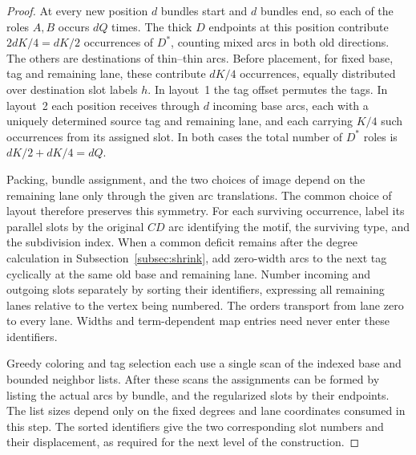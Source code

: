 \begin{proof}
\smallskip
At every new position $d$ bundles start and $d$ bundles end, so each of
the roles $A,B$ occurs $dQ$ times. The thick $D$ endpoints at this position
contribute $2dK/4=dK/2$ occurrences of $D^*$, counting mixed arcs in both
old directions. The others are destinations of thin--thin arcs. Before
placement, for fixed base, tag and remaining lane, these contribute $dK/4$
occurrences, equally distributed over destination slot labels $h$. In
layout~1 the tag offset permutes the tags. In layout~2 each position receives
through $d$ incoming base arcs, each with a uniquely determined source tag
and remaining lane, and each carrying $K/4$ such occurrences from its
assigned slot. In both cases the total number of $D^*$ roles is
$dK/2+dK/4=dQ$.

Packing, bundle assignment, and the two choices of image depend on the
remaining lane only through the given arc translations. The common choice
of layout therefore preserves this symmetry. For each surviving occurrence,
label its parallel slots by the original $CD$ arc identifying the motif, the
surviving type, and the subdivision index. When a common deficit remains
after the degree calculation in Subsection~\ref{subsec:shrink}, add zero-width
arcs to the next tag cyclically at the same old base and remaining lane.
Number incoming and outgoing slots separately by sorting their identifiers,
expressing all remaining lanes relative to the vertex being numbered. The
orders transport from lane zero to every lane. Widths and term-dependent map
entries need never enter these identifiers.

Greedy coloring and tag selection each use a single scan of the indexed
base and bounded neighbor lists. After these scans the assignments can be
formed by listing the actual arcs by bundle, and the regularized slots by
their endpoints. The list sizes depend only on the fixed degrees and lane
coordinates consumed in this step. The sorted identifiers give the two
corresponding slot numbers and their displacement, as required for the
next level of the construction.
\end{proof}
